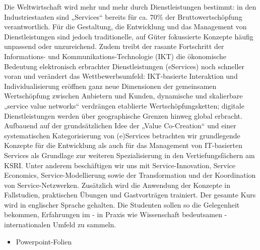 \begin{course}
\begin{content}
Die Weltwirtschaft wird mehr und mehr durch Dienstleistungen bestimmt: in den Industriestaaten sind „Services“ bereits für ca. 70\% der Bruttowertschöpfung verantwortlich. Für die Gestaltung, die Entwicklung und das Management von Dienstleistungen sind jedoch traditionelle, auf Güter fokussierte Konzepte häufig unpassend oder unzureichend. Zudem treibt der rasante Fortschritt der Informations- und Kommunikations-Technologie (IKT) die ökonomische Bedeutung elektronisch erbrachter Dienstleistungen (eServices) noch schneller voran und verändert das Wettbewerbsumfeld: IKT-basierte Interaktion und Individualisierung eröffnen ganz neue Dimensionen der gemeinsamen Wertschöpfung zwischen Anbietern und Kunden, dynamische und skalierbare „service value networks“ verdrängen etablierte Wertschöpfungsketten; digitale Dienstleistungen werden über geographische Grenzen hinweg global erbracht.\newline
\newline
Aufbauend auf der grundsätzlichen Idee der „Value Co-Creation“ und einer systematischen Kategorisierung von (e)Services betrachten wir grundlegende Konzepte für die Entwicklung als auch für das Management von IT-basierten Services als Grundlage zur weiteren Spezialisierung in den Vertiefungsfächern am KSRI. Unter anderem beschäftigen wir uns mit Service-Innovation, Service Economics, Service-Modellierung sowie der Transformation und der Koordination von Service-Netzwerken.\newline
\newline
Zusätzlich wird die Anwendung der Konzepte in Fallstudien, praktischen Übungen und Gastvorträgen trainiert. Der gesamte Kurs wird in englischer Sprache gehalten. Die Studenten sollen so die Gelegenheit bekommen, Erfahrungen im - in Praxis wie Wissenschaft bedeutsamen - internationalen Umfeld zu sammeln.


\end{content}

\begin{media}\begin{itemize}\item Powerpoint-Folien  \end{itemize}\end{media}


\end{course}
